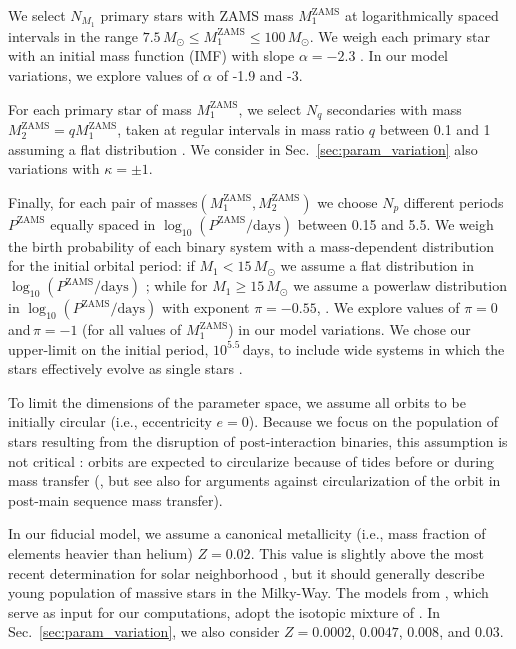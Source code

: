 \documentclass{aa}
\DeclareRobustCommand{\Secref}[1]{Sec.~\ref{#1}}
\begin{document}
We select $N_{M_1}$ primary stars with ZAMS mass $M_1^\mathrm{ZAMS}$
at logarithmically spaced intervals in the range $7.5\,M_\odot\leq M_1^\mathrm{ZAMS}
\leq 100\,M_\odot$. We weigh each primary star with an initial mass function (IMF) with
slope $\alpha=-2.3$ 
\citep[][]{kroupa:01}. In our model
variations, we explore values of $\alpha$ of -1.9
\citep[][]{schneider:18} and -3.

For each primary star of mass $M_1^\mathrm{ZAMS}$, we select $N_q$ secondaries with mass
$M_2^\mathrm{ZAMS} = qM_1^\mathrm{ZAMS}$, taken at regular intervals
in mass ratio $q$ between 0.1 and 1 assuming a
flat distribution \citep[slope $\kappa=0$, e.g.,][]{kouwenhoven:05,sana:12}. We consider in
\Secref{sec:param_variation} also variations with $\kappa=\pm1$.

Finally, for each pair of masses$(M_1^\mathrm{ZAMS},M_2^\mathrm{ZAMS})$ we choose $N_p$ different periods
$P^\mathrm{ZAMS}$ equally spaced in $\log_{10}(P^\mathrm{ZAMS}/\mathrm{days})$
between 0.15 and 5.5. We weigh the birth probability of each binary system with a
mass-dependent distribution for the initial orbital period: if $M_1<15\,M_\odot$ we assume
a flat distribution in $\log_{10}(P^\mathrm{ZAMS}/\mathrm{days})$
\citep[][]{opik:24,kobulnicky:07}; while for $M_1\geq15\,M_\odot$ we assume a
powerlaw distribution in $\log_{10}(P^\mathrm{ZAMS}/\mathrm{days})$ with exponent
$\pi=-0.55$, \citep[][]{sana:12}. We explore values of $\pi=0\,$and\,$\pi=-1$
(for all values of $M_1^\mathrm{ZAMS}$)
in our model variations. We chose our upper-limit on the initial period, $10^{5.5}$\,days, to include
wide systems in which the stars effectively evolve as single stars \citep[][]{demink:15}.

To limit the dimensions of the parameter space, we assume
all orbits to be initially circular (i.e., eccentricity
$e=0$). Because we focus on the population of stars resulting from the
disruption of post-interaction binaries, this assumption is not
critical \citep[][]{demink:15}: orbits are expected to
circularize
because of tides before or during mass transfer
(\citealt{belczynski:99,hurley:02}, but see also \citealt{eldridge:09}
for arguments against circularization of the orbit in post-main
sequence mass transfer). 

In our fiducial model, we assume a canonical metallicity (i.e., mass fraction of
elements heavier than helium) $Z=0.02$. This value is slightly above
the most recent determination for solar neighborhood
\cite{asplund:09}, but it should generally describe young population
of massive stars in the Milky-Way. The models from \cite{pols:98}, which serve as
input for our computations, adopt the
isotopic mixture of \cite{anders:89}. In
\Secref{sec:param_variation}, we also consider $Z=0.0002$, $0.0047$, $0.008$,
and $0.03$.
\end{document}
